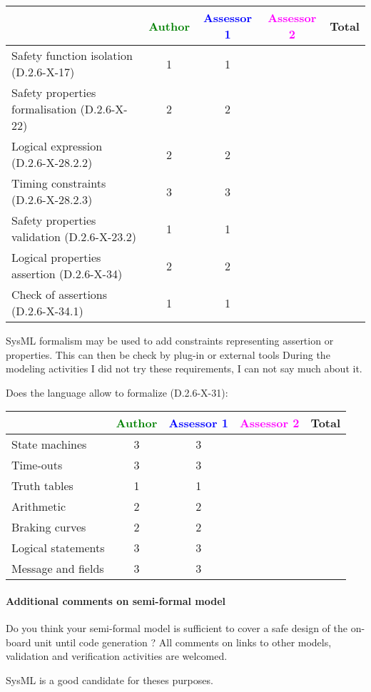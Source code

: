 \begin{tabular}{|l | c | c | c | c|}
\hline
& \textcolor{green}{Author} & \textcolor{blue}{Assessor 1} & \textcolor{magenta}{Assessor 2} & Total \\
\hline 
Safety function isolation (D.2.6-X-17)  & 1& 1& &  \\
\hline 
Safety properties formalisation (D.2.6-X-22)  &2 & 2& &  \\
\hline
Logical expression (D.2.6-X-28.2.2)  &2 & 2& &  \\
\hline
Timing constraints (D.2.6-X-28.2.3)  &3 & 3 & &  \\
\hline
Safety properties validation (D.2.6-X-23.2)  &1 & 1& &  \\
\hline
Logical properties assertion (D.2.6-X-34)  &2 & 2& &  \\
\hline
Check  of assertions (D.2.6-X-34.1)  &1 & 1& &  \\
\hline
\end{tabular}
\begin{author_comment}
SysML formalism may be used to add constraints representing assertion
or properties. This can then be check by plug-in or external tools
During the modeling activities I did not try these requirements, I can
not say much about it.
\end{author_comment}
Does the language allow to  formalize (D.2.6-X-31):

\begin{tabular}{|l | c | c | c | c|}
\hline
& \textcolor{green}{Author} & \textcolor{blue}{Assessor 1} & \textcolor{magenta}{Assessor 2} & Total \\
\hline 
State machines  &3 & 3& &  \\
\hline
Time-outs  &3 & 3& &  \\
\hline
Truth tables  &1 &1 & &  \\
\hline
Arithmetic  &2 & 2& &  \\
\hline
Braking curves  &2 & 2& &  \\
\hline
Logical statements &3 & 3& &  \\
\hline
Message and fields &3 & 3& &  \\
\hline
\end{tabular}

\paragraph{Additional comments on semi-formal  model} Do you think your semi-formal  model is sufficient to cover a safe design of the on-board unit until code generation ?
All comments on links to  other models, validation and verification activities are welcomed.
\begin{author_comment}
SysML \cite{sysmlbook} is a good candidate for theses purposes.
\end{author_comment}
